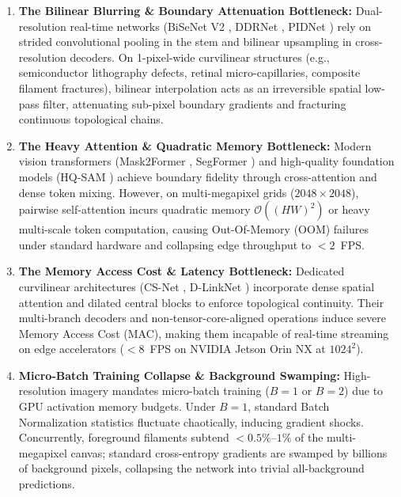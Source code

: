 \documentclass[11pt,a4paper]{article}
\begin{document}
\begin{enumerate}
    \item \textbf{The Bilinear Blurring \& Boundary Attenuation Bottleneck:} Dual-resolution real-time networks (BiSeNet V2 \cite{yu2021bisenet}, DDRNet \cite{hong2021deep}, PIDNet \cite{xu2023pidnet}) rely on strided convolutional pooling in the stem and bilinear upsampling in cross-resolution decoders. On 1-pixel-wide curvilinear structures (e.g., semiconductor lithography defects, retinal micro-capillaries, composite filament fractures), bilinear interpolation acts as an irreversible spatial low-pass filter, attenuating sub-pixel boundary gradients and fracturing continuous topological chains.
    \item \textbf{The Heavy Attention \& Quadratic Memory Bottleneck:} Modern vision transformers (Mask2Former \cite{cheng2022masked}, SegFormer \cite{xie2021segformer}) and high-quality foundation models (HQ-SAM \cite{ke2023hqsam}) achieve boundary fidelity through cross-attention and dense token mixing. However, on multi-megapixel grids ($2048\times 2048$), pairwise self-attention incurs quadratic memory $\mathcal{O}((HW)^2)$ or heavy multi-scale token computation, causing Out-Of-Memory (OOM) failures under standard hardware and collapsing edge throughput to $<2$~FPS.
    \item \textbf{The Memory Access Cost \& Latency Bottleneck:} Dedicated curvilinear architectures (CS-Net \cite{mou2019csnet}, D-LinkNet \cite{zhou2018dlinknet}) incorporate dense spatial attention and dilated central blocks to enforce topological continuity. Their multi-branch decoders and non-tensor-core-aligned operations induce severe Memory Access Cost (MAC), making them incapable of real-time streaming on edge accelerators ($<8$~FPS on NVIDIA Jetson Orin NX at $1024^2$).
    \item \textbf{Micro-Batch Training Collapse \& Background Swamping:} High-resolution imagery mandates micro-batch training ($B=1$ or $B=2$) due to GPU activation memory budgets. Under $B=1$, standard Batch Normalization statistics fluctuate chaotically, inducing gradient shocks. Concurrently, foreground filaments subtend $<0.5\%\text{--}1\%$ of the multi-megapixel canvas; standard cross-entropy gradients are swamped by billions of background pixels, collapsing the network into trivial all-background predictions.
\end{enumerate}
\end{document}

